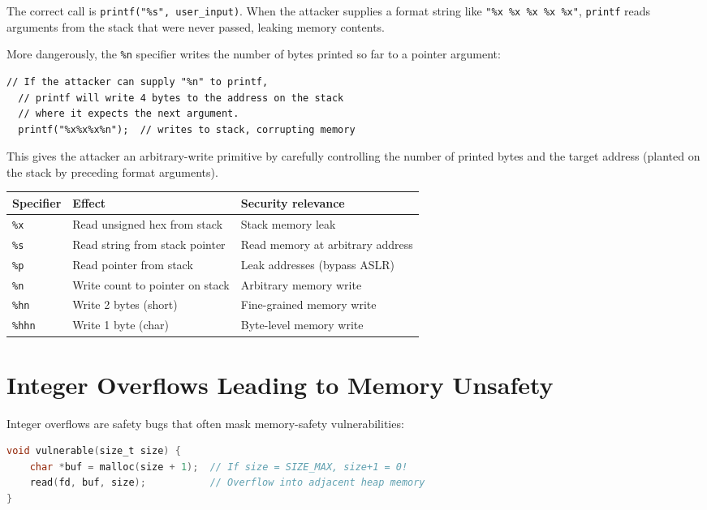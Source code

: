 The correct call is \texttt{printf("\%s", user\_input)}. When the attacker supplies a format string like \texttt{"\%x \%x \%x \%x \%x"}, \texttt{printf} reads arguments from the stack that were never passed, leaking memory contents.

More dangerously, the \texttt{\%n} specifier writes the number of bytes printed so far to a pointer argument:

\begin{lstlisting}[caption=Using \%n to write memory]
  // If the attacker can supply "%n" to printf,
  // printf will write 4 bytes to the address on the stack
  // where it expects the next argument.
  printf("%x%x%x%n");  // writes to stack, corrupting memory
\end{lstlisting}

This gives the attacker an arbitrary-write primitive by carefully controlling the number of printed bytes and the target address (planted on the stack by preceding format arguments).

\begin{longtable}{p{2.5cm}p{4cm}p{5cm}}
	\toprule
	\textbf{Specifier} & \textbf{Effect}                 & \textbf{Security relevance}      \\
	\midrule
	\texttt{\%x}       & Read unsigned hex from stack    & Stack memory leak                \\
	\texttt{\%s}       & Read string from stack pointer  & Read memory at arbitrary address \\
	\texttt{\%p}       & Read pointer from stack         & Leak addresses (bypass ASLR)     \\
	\texttt{\%n}       & Write count to pointer on stack & Arbitrary memory write           \\
	\texttt{\%hn}      & Write 2 bytes (short)           & Fine-grained memory write        \\
	\texttt{\%hhn}     & Write 1 byte (char)             & Byte-level memory write          \\
	\bottomrule
\end{longtable}

\section{Integer Overflows Leading to Memory Unsafety}

Integer overflows are safety bugs that often mask memory-safety vulnerabilities:

\begin{lstlisting}[language=C, caption=Integer overflow enabling overflow]
void vulnerable(size_t size) {
    char *buf = malloc(size + 1);  // If size = SIZE_MAX, size+1 = 0!
    read(fd, buf, size);           // Overflow into adjacent heap memory
}
\end{lstlisting}

